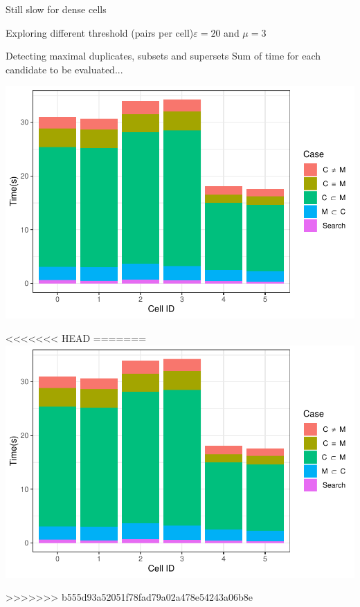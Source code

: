 \documentclass{beamer}
\begin{document}
\begin{frame}{Still slow for dense cells}
\begin{frame}{Exploring different threshold (pairs per cell)}{$\varepsilon=20$ and $\mu=3$}
\begin{frame}{Detecting maximal duplicates, subsets and supersets}
        {Sum of time for each candidate to be evaluated...}
        \centering
        \begin{minipage}{0.49\textwidth}
                \includegraphics[width=\textwidth]{figures/Maximals/performanceBySum1}
        \end{minipage} %
        \begin{minipage}{0.49\textwidth}
<<<<<<< HEAD
=======
                \includegraphics[width=\textwidth]{figures/Maximals/performanceBySum1}
        \end{minipage} %
        \begin{minipage}{0.49\textwidth}
>>>>>>> b555d93a52051f78fad79a02a478e54243a06b8e

\end{minipage}
\end{frame}
\end{frame}
\end{frame}
\end{document}
